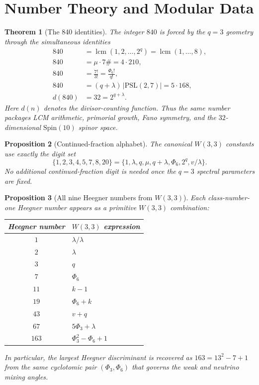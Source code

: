\documentclass[12pt,a4paper]{article}
\newtheorem{theorem}{Theorem}[section]
\newtheorem{proposition}[theorem]{Proposition}
\begin{document}
\section{Number Theory and Modular Data}
\label{sec:numbertheory}

\begin{theorem}[The 840 identities]\label{thm:840-identities}
The integer $840$ is forced by the $q=3$ geometry through the simultaneous
identities
\begin{align}
  840 &= \operatorname{lcm}(1,2,\ldots,2^q)
      = \operatorname{lcm}(1,\ldots,8),\label{eq:840-lcm}\\
  840 &= \mu\cdot 7\# = 4\cdot 210,\label{eq:840-primorial}\\
  840 &= \frac{7!}{3!} = \frac{\Phi_6!}{q!},\label{eq:840-factorial}\\
  840 &= (q+\lambda)\,|\mathrm{PSL}(2,7)| = 5\cdot 168,\label{eq:840-psl}\\
  d(840) &= 32 = 2^{q+\lambda}.\label{eq:840-divcount}
\end{align}
Here $d(n)$ denotes the divisor-counting function. Thus the same number
packages LCM arithmetic, primorial growth, Fano symmetry, and the
$32$-dimensional $\mathrm{Spin}(10)$ spinor space.
\end{theorem}

\begin{proposition}[Continued-fraction alphabet]\label{prop:cf-alphabet}
The canonical $W(3,3)$ constants use exactly the digit set
\[
  \{1,2,3,4,5,7,8,20\}
  = \{1,\lambda,q,\mu,q+\lambda,\Phi_6,2^q,v/\lambda\}.
\]
No additional continued-fraction digit is needed once the $q=3$ spectral
parameters are fixed.
\end{proposition}

\begin{proposition}[All nine Heegner numbers from $W(3,3)$]\label{prop:heegner}
Each class-number-one Heegner number appears as a primitive $W(3,3)$
combination:
\begin{center}
\renewcommand{\arraystretch}{1.15}
\begin{tabular}{cl}
\toprule
Heegner number & $W(3,3)$ expression \\
\midrule
$1$   & $\lambda/\lambda$ \\
$2$   & $\lambda$ \\
$3$   & $q$ \\
$7$   & $\Phi_6$ \\
$11$  & $k-1$ \\
$19$  & $\Phi_6+k$ \\
$43$  & $v+q$ \\
$67$  & $5\Phi_3+\lambda$ \\
$163$ & $\Phi_3^2-\Phi_6+1$ \\
\bottomrule
\end{tabular}
\end{center}
In particular, the largest Heegner discriminant is recovered as
$163 = 13^2 - 7 + 1$ from the same cyclotomic pair $(\Phi_3,\Phi_6)$ that
governs the weak and neutrino mixing angles.
\end{proposition}
\end{document}
